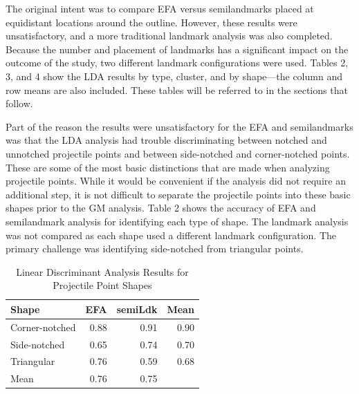 \documentclass[letterpaper]{article}
\begin{document}
The original intent was to compare EFA versus semilandmarks placed at equidistant locations around the outline. However, these results were unsatisfactory, and a more traditional landmark analysis was also completed. Because the number and placement of landmarks has a significant impact on the outcome of the study, two different landmark configurations were used. Tables 2, 3, and 4 show the LDA results by type, cluster, and by shape---the column and row means are also included. These tables will be referred to in the sections that follow.

Part of the reason the results were unsatisfactory for the EFA and semilandmarks was that the LDA analysis had trouble discriminating between notched and unnotched projectile points and between side-notched and corner-notched points. These are some of the most basic distinctions that are made when analyzing projectile points. While it would be convenient if the analysis did not require an additional step, it is not difficult to separate the projectile points into these basic shapes prior to the GM analysis. Table 2 shows the accuracy of EFA and semilandmark analysis for identifying each type of shape. The landmark analysis was not compared as each shape used a different landmark configuration. The primary challenge was identifying side-notched from triangular points.

\begin{table}

\caption{\label{tab:LDAResultsShape}Linear Discriminant Analysis Results for Projectile Point Shapes}
\centering
\begin{tabular}[t]{lrrr}
\toprule
Shape & EFA & semiLdk & Mean\\
\midrule
Corner-notched & 0.88 & 0.91 & 0.90\\
Side-notched & 0.65 & 0.74 & 0.70\\
Triangular & 0.76 & 0.59 & 0.68\\
Mean & 0.76 & 0.75 & \\
\bottomrule
\end{tabular}
\end{table}
\end{document}
